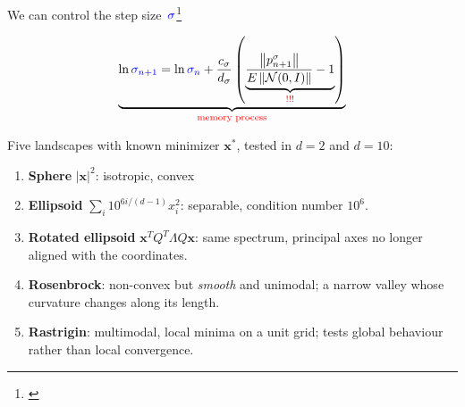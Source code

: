 \documentclass[11pt, aspectratio=169]{beamer}
\begin{document}
\begin{frame}

  We can control the step size~$\textcolor{blue}{\sigma}$\footnote[4]{\cite{aguirre2026covariance}}

  \begin{align*}
    \underbrace{\ln\textcolor{blue}{\sigma_{n+1}} = \ln\textcolor{blue}{\sigma_{n}} + \frac{c_{\sigma}}{d_{\sigma}}\left( \underbrace{\frac{\left\| p_{n+1}^{\sigma} \right\|}{E\left\| \mathcal{N}(0,I) \right\|}-1}_{\textcolor{red}{!!!}}\right)}_{\text{\textcolor{red}{memory process}}}
  \end{align*}
\end{frame}


\begin{frame}
  \vspace{4cm}

  \begin{figure}[h] 
  \end{figure}
\end{frame}


\begin{frame}
  \vspace{.2cm}

    Five landscapes with known minimizer $\mathbf{x}^*$, tested in $d=2$ and $d=10$:
    \vspace{0.3cm}

    \begin{enumerate}
        \item \textbf{Sphere} $|\mathbf{x}|^2$: isotropic, convex
        \item \textbf{Ellipsoid} $\sum_i 10^{6i/(d-1)}x_i^2$: separable,
              condition number $10^6$.
        \item \textbf{Rotated ellipsoid} $\mathbf{x}^{T}Q^{T}\Lambda Q\mathbf{x}$:
              same spectrum, principal axes no longer aligned with the coordinates.
        \item \textbf{Rosenbrock}: non-convex but \emph{smooth} and unimodal;
              a narrow valley whose curvature changes along its length.
        \item \textbf{Rastrigin}: {\color{red}multimodal}, {\color{red}local minima} on a unit grid;
              tests global behaviour rather than local convergence.
    \end{enumerate}
\end{frame}
\end{document}
